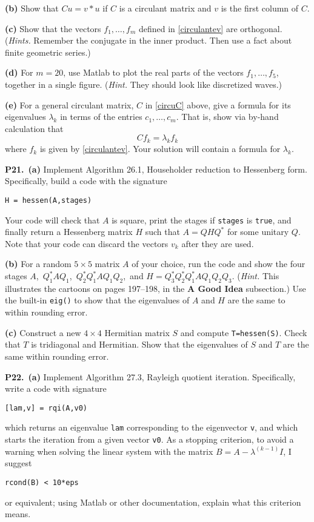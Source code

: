 \documentclass[12pt]{amsart}
\newcommand{\prob}[1]{\bigskip\noindent\textbf{#1.}\quad }
\newcommand{\epart}[1]{\medskip\noindent\textbf{(#1)}\quad }
\newcommand{\ppart}[1]{\,\textbf{(#1)}\quad }
\begin{document}
\epart{b}  Show that $C u = v\ast u$ if $C$ is a circulant matrix and $v$ is the first column of $C$.

\epart{c}  Show that the vectors $f_1,\dots,f_m$ defined in \eqref{circulantev} are orthogonal.  (\emph{Hints.}  Remember the conjugate in the inner product.  Then use a fact about finite geometric series.)

\epart{d}  For $m=20$, use Matlab to plot the real parts of the vectors $f_1,\dots,f_5$, together in a single figure.  (\emph{Hint.} They should look like discretized waves.)

\epart{e}  For a general circulant matrix, $C$ in \eqref{circuC} above, give a formula for its eigenvalues $\lambda_k$ in terms of the entries $c_1,\dots,c_m$.  That is, show via by-hand calculation that
    $$C f_k = \lambda_k f_k$$
where $f_k$ is given by \eqref{circulantev}.  Your solution will contain a formula for $\lambda_k$.


\prob{P21}  \ppart{a}  Implement Algorithm 26.1, Householder reduction to Hessenberg form.  Specifically, build a code with the signature

\begin{center}
\verb|H = hessen(A,stages)|
\end{center}

\noindent Your code will check that $A$ is square, print the stages if \verb|stages| is \verb|true|, and finally return a Hessenberg matrix $H$ such that $A=QHQ^*$ for some unitary $Q$.  Note that your code can discard the vectors $v_k$ after they are used.

\epart{b}  For a random $5\times 5$ matrix $A$ of your choice, run the code and show the four stages $A$,\, $Q_1^*AQ_1$,\, $Q_2^*Q_1^*AQ_1Q_2$,\, and $H=Q_3^*Q_2^*Q_1^*AQ_1Q_2Q_3$.  (\emph{Hint.}  This illustrates the cartoons on pages 197--198, in the \textbf{A Good Idea} subsection.)  Use the built-in \texttt{eig()} to show that the eigenvalues of $A$ and $H$ are the same to within rounding error.

\epart{c}  Construct a new $4\times 4$ Hermitian matrix $S$ and compute \verb|T=hessen(S)|.  Check that $T$ is tridiagonal and Hermitian.  Show that the eigenvalues of $S$ and $T$ are the same within rounding error.


\prob{P22}  \ppart{a}  Implement Algorithm 27.3, Rayleigh quotient iteration.  Specifically, write a code with signature
\begin{center}
\verb|[lam,v] = rqi(A,v0)|
\end{center}
which returns an eigenvalue \verb|lam| corresponding to the eigenvector \verb|v|, and which starts the iteration from a given vector \verb|v0|.  As a stopping criterion, to avoid a warning when solving the linear system with the matrix $B=A-\lambda^{(k-1)} I$, I suggest
\begin{center}
\verb|rcond(B) < 10*eps|
\end{center}
or equivalent; using Matlab or other documentation, explain what this criterion means.
\end{document}
